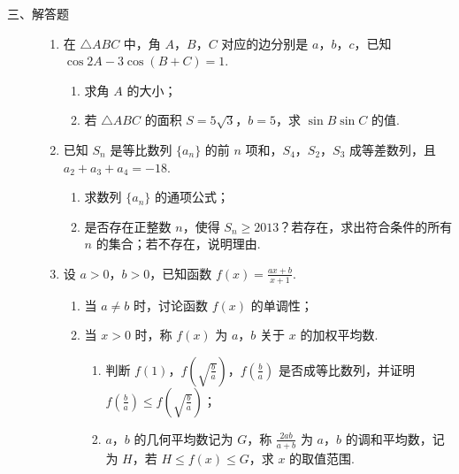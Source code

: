 \begin{description}

    \item[三、解答题]

    \begin{enumerate}[leftmargin=5pt]

      \addtocounter{enumi}{+17}

        \item 在 \(\triangle ABC\) 中，角 \(A\)，\(B\)，\(C\) 对应的边分别是 \(a\)，\(b\)，\(c\)，已知 \(\cos 2A-3\cos(B+C)=1\).

\begin{enumerate}
\item 求角 \(A\) 的大小；
\item 若 \(\triangle ABC\) 的面积 \(S=5\sqrt{3}\)，\(b=5\)，求 \(\sin B\sin C\) 的值.
\end{enumerate}

        \item 已知 \(S_n\) 是等比数列 \(\{a_n\}\) 的前 \(n\) 项和，\(S_4\)，\(S_2\)，\(S_3\) 成等差数列，且 \(a_2+a_3+a_4=-18\).

\begin{enumerate}
\item 求数列 \(\{a_n\}\) 的通项公式；
\item 是否存在正整数 \(n\)，使得 \(S_n\geqslant 2013\)？若存在，求出符合条件的所有 \(n\) 的集合；若不存在，说明理由.
\end{enumerate}

        \item 设 \(a>0\)，\(b>0\)，已知函数 \(f(x)=\frac{ax+b}{x+1}\).

\begin{enumerate}
\item 当 \(a\neq b\) 时，讨论函数 \(f(x)\) 的单调性；
\item 当 \(x>0\) 时，称 \(f(x)\) 为 \(a\)，\(b\) 关于 \(x\) 的加权平均数.
\begin{enumerate}
\item 判断 \(f(1)\)，\(f\left(\sqrt{\frac{b}{a}}\right)\)，\(f\left(\frac{b}{a}\right)\) 是否成等比数列，并证明 \(f\left(\frac{b}{a}\right)\leqslant f\left(\sqrt{\frac{b}{a}}\right)\)；
\item \(a\)，\(b\) 的几何平均数记为 \(G\)，称 \(\frac{2ab}{a+b}\) 为 \(a\)，\(b\) 的调和平均数，记为 \(H\)，若 \(H\leqslant f(x)\leqslant G\)，求 \(x\) 的取值范围.
\end{enumerate}
\end{enumerate}


\end{enumerate}
\end{description}
